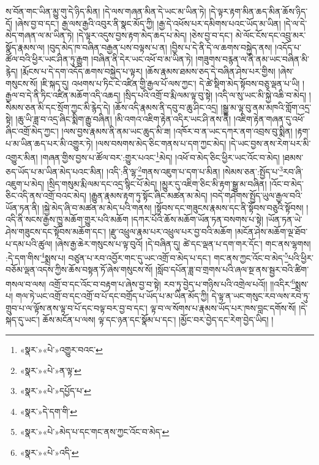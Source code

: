 ས་བོན་གང་ཡིན་མྱུ་གུ་དེ་ཉིད་མིན། །དེ་ལས་གཞན་མིན་དེ་ཡང་མ་ཡིན་ཏེ། །དེ་ལྟར་རྟག་མིན་ཆད་མིན་ཆོས་ཉིད་དོ། །ཞེས་བྱ་བ་དང་། རྒྱ་ལས་རྒྱའི་འབུར་ནི་སྣང་མོད་ཀྱི། །རྒྱ་དེ་འཕོས་པར་དམིགས་པའང་ཡོད་མ་ཡིན། །དེ་ལ་དེ་མེད་གཞན་ལ་མ་ཡིན་ཏེ། །དེ་ལྟར་འདུས་བྱས་རྟག་མེད་ཆད་པ་མེད། །ཅེས་བྱ་བ་དང་། མེ་ལོང་ངོས་དང་འབྲུ་མར་སྣོད་རྣམས་ལ། །བུད་མེད་ཁ་བཞིན་བརྒྱན་པས་བལྟས་པ་ན། །བྱིས་པ་དེ་ནི་དེ་ལ་ཆགས་བསྐྱེད་ནས། །འདོད་པ་ཚོལ་བའི་ཕྱིར་ཡང་ཤིན་ཏུ་རྒྱུག །བཞིན་ནི་དེར་ཡང་འཕོ་བ་མ་ཡིན་ཏེ། །གཟུགས་བརྙན་ལ་ནི་ནམ་ཡང་བཞིན་མི་རྙེད། །རྨོངས་པ་དེ་དག་འདོད་ཆགས་བསྐྱེད་པ་ལྟར། །ཆོས་རྣམས་ཐམས་ཅད་དེ་བཞིན་ཤེས་པར་གྱིས། །ཞེས་གསུངས་སོ། །ཇི་སྐད་དུ། འཕགས་པ་ཏིང་ངེ་འཛིན་གྱི་རྒྱལ་པོ་ལས་ཀྱང་། དེ་ཚེ་སྡིག་མེད་སྟོབས་བཅུ་ལྡན་པ་ཡི། །རྒྱལ་བ་དེ་ནི་ཏིང་འཛིན་མཆོག་འདི་འཆད། །སྲིད་པའི་འགྲོ་བ་རྨི་ལམ་ལྟ་བུ་སྟེ། །འདི་ལ་སུ་ཡང་མི་སྐྱེ་འཆི་བ་མེད། །སེམས་ཅན་མི་དང་སྲོག་ཀྱང་མི་རྙེད་དེ། །ཆོས་འདི་རྣམས་ནི་དབུ་བ་ཆུ་ཤིང་འདྲ། །སྒྱུ་མ་ལྟ་བུ་ནམ་མཁའི་གློག་འདྲ་སྟེ། །ཆུ་ཡི་ཟླ་བ་འདྲ་ཞིང་སྨིག་རྒྱུ་བཞིན། །མི་འགའ་འཇིག་རྟེན་འདིར་ཡང་ཤི་ནས་ནི། །འཇིག་རྟེན་གཞན་དུ་འཕོ་ཞིང་འགྲོ་མེད་ཀྱང་། །ལས་བྱས་རྣམས་ནི་ནམ་ཡང་ཆུད་མི་ཟ། །འཁོར་བ་ན་ཡང་དཀར་ནག་འབྲས་བུ་སྨིན། །རྟག་པ་མ་ཡིན་ཆད་པར་མི་འགྱུར་ཏེ། །ལས་བསགས་མེད་ཅིང་གནས་པ་དག་ཀྱང་མེད། །དེ་ཡང་བྱས་ནས་རེག་པར་མི་འགྱུར་མིན། །གཞན་གྱིས་བྱས་པ་ཚོལ་བར་:གྱུར་པའང་\footnote{«སྣར་»«པེ་»འགྱུར་བའང་}མེད། །འཕོ་བ་མེད་ཅིང་ཕྱིར་ཡང་འོང་བ་མེད། །ཐམས་ཅད་ཡོད་པ་མ་ཡིན་མེད་པའང་མིན། །འདི་:ནི་ལྷ་\footnote{«སྣར་»«པེ་»ན་ལྟ་}གནས་འཇུག་པ་དག་པ་མིན། །སེམས་ཅན་:སྤྱོད་པ་\footnote{«སྣར་»«པེ་»དཔྱོད་པ་}རབ་ཞི་འཇུག་པ་མེད། །སྲིད་གསུམ་རྨི་ལམ་དང་འདྲ་སྙིང་པོ་མེད། །མྱུར་དུ་འཇིག་ཅིང་མི་རྟག་སྒྱུ་མ་བཞིན། །འོང་བ་མེད་ཅིང་འདི་ནས་འགྲོ་བའང་མེད། །རྒྱུན་རྣམས་རྟག་ཏུ་སྟོང་ཞིང་མཚན་མ་མེད། །བདེ་གཤེགས་སྤྱོད་ཡུལ་རྒྱལ་བའི་ཡོན་ཏན་ནི། །སྐྱེ་མེད་ཞི་བ་མཚན་མ་མེད་པའི་གནས། །སྟོབས་དང་གཟུངས་རྣམས་དང་ནི་སྟོབས་བཅུའི་སྟོབས། །འདི་ནི་སངས་རྒྱས་ཁྱུ་མཆོག་གྱུར་པའི་མཆོག །དཀར་པོའི་ཆོས་མཆོག་ཡོན་ཏན་བསགས་པ་སྟེ། །ཡོན་ཏན་ཡེ་ཤེས་གཟུངས་དང་སྟོབས་མཆོག་དང་། །རྫུ་འཕྲུལ་རྣམ་པར་འཕྲུལ་པར་བྱ་བའི་མཆོག །མངོན་ཤེས་མཆོག་ལྔ་ཐོབ་པ་དམ་པའི་ཚུལ། །ཞེས་རྒྱ་ཆེར་གསུངས་པ་ལྟ་བུའོ། །དེ་བཞིན་དུ། ཚེ་དང་ལྡན་པ་དག་གར་དོང་། གང་ནས་ལྷགས། :དེ་དག་གིས་\footnote{«སྣར་»དེ་དག་གི་}སྨྲས་པ། བཙུན་པ་རབ་འབྱོར་གང་དུ་ཡང་འགྲོ་བ་མེད་པ་དང་། གང་ནས་ཀྱང་འོང་བ་མེད་\footnote{«སྣར་»«པེ་»མེད་པ་དང་གང་ནས་ཀྱང་འོང་བ་མེད་}པའི་ཕྱིར་བཅོམ་ལྡན་འདས་ཀྱིས་ཆོས་བསྟན་ཏོ་ཞེས་གསུངས་སོ། །སློབ་དཔོན་ཟླ་བ་གྲགས་པའི་ཞལ་སྔ་ནས་སྦྱར་བའི་ཚིག་གསལ་བ་ལས། འགྲོ་བ་དང་འོང་བ་བརྟག་པ་ཞེས་བྱ་བ་སྟེ། རབ་ཏུ་བྱེད་པ་གཉིས་པའི་འགྲེལ་པའོ།། །།འདིར་\footnote{«སྣར་»«པེ་»འདི་}སྨྲས་པ། གལ་ཏེ་ཡང་འགྲོ་བ་དང་འགྲོ་བ་པོ་དང་བགྲོད་པ་ཡོད་པ་མ་ཡིན་མོད་ཀྱི། དེ་ལྟ་ན་ཡང་གསུང་རབ་ལས་རབ་ཏུ་གྲུབ་པ་ལ་ལྟོས་ནས་ལྟ་བ་པོ་དང་བལྟ་བར་བྱ་བ་དང་། ལྟ་བ་ལ་སོགས་པ་རྣམས་ཡོད་པར་ཁས་བླང་དགོས་སོ། །དེ་སྐད་དུ་ཡང་། ཆོས་མངོན་པ་ལས། ལྟ་དང་ཉན་དང་སྣོམ་པ་དང་། །མྱོང་བར་བྱེད་དང་རེག་བྱེད་ཡིད། །
